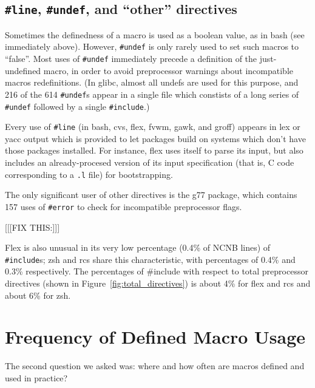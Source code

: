 \documentclass[11pt]{article}
\begin{document}
\subsection{{\tt \#line}, {\tt \#undef}, and ``other'' directives}

Sometimes the definedness of a macro is used as a boolean value, as in bash
(see immediately above).  However, {\tt \#undef} is only rarely used to set
such macros to ``false''.  Most uses of {\tt \#undef} immediately precede a
definition of the just-undefined macro, in order to avoid preprocessor
warnings about incompatible macros redefinitions.  (In glibc, almost all
undefs are used for this purpose, and 216 of the 614 {\tt \#undef}s appear
in a single file which constists of a long series of {\tt \#undef} followed
by a single {\tt \#include}.)

Every use of {\tt \#line} (in bash, cvs, flex, fvwm, gawk, and groff)
appears in lex or yacc output which is provided to let packages build on
systems which don't have those packages installed.  For instance, flex uses
itself to parse its input, but also includes an already-procesed version of
its input specification (that is, C code corresponding to a {\tt .l} file)
for bootstrapping.

The only significant user of other directives is the g77 package, which
contains 157 uses of {\tt \#error} to check for incompatible preprocessor
flags.


[[[FIX THIS:]]]

Flex is also unusual in
its very low percentage (0.4\% of NCNB lines) of {\tt \#include}s; zsh and 
rcs share this characteristic, with percentages of 0.4\% and 0.3\%
respectively.  The percentages of {\#include} with respect to total
preprocessor directives (shown in Figure~\ref{fig:total_directives}) is
about 4\% for flex and rcs and about 6\% for zsh.


\section{Frequency of Defined Macro Usage}
\label{sec:usage}

The second question we asked was: where and how often are macros
defined and used in practice?  

%
%
\end{document}

